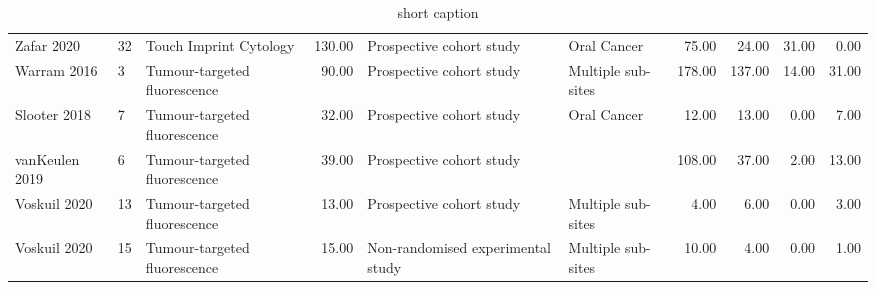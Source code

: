 \begin{table}[ht]
\begin{tabular}{lllrllrrrr}
  Zafar 2020 & 32 & Touch Imprint Cytology & 130.00 & Prospective cohort study & Oral Cancer & 75.00 & 24.00 & 31.00 & 0.00 \\ 
  Warram 2016 & 3 & Tumour-targeted fluorescence & 90.00 & Prospective cohort study & Multiple sub-sites & 178.00 & 137.00 & 14.00 & 31.00 \\ 
  Slooter 2018 & 7 & Tumour-targeted fluorescence & 32.00 & Prospective cohort study & Oral Cancer & 12.00 & 13.00 & 0.00 & 7.00 \\ 
  vanKeulen 2019 & 6 & Tumour-targeted fluorescence & 39.00 & Prospective cohort study &  & 108.00 & 37.00 & 2.00 & 13.00 \\ 
  Voskuil 2020 & 13 & Tumour-targeted fluorescence & 13.00 & Prospective cohort study & Multiple sub-sites & 4.00 & 6.00 & 0.00 & 3.00 \\ 
  Voskuil 2020 & 15 & Tumour-targeted fluorescence & 15.00 & Non-randomised experimental study & Multiple sub-sites & 10.00 & 4.00 & 0.00 & 1.00 \\ 
   \hline
\end{tabular}
\endgroup
\caption[Study details, demographics and outcome data]{short caption} 
\label{tab:study_details}
\end{table}
